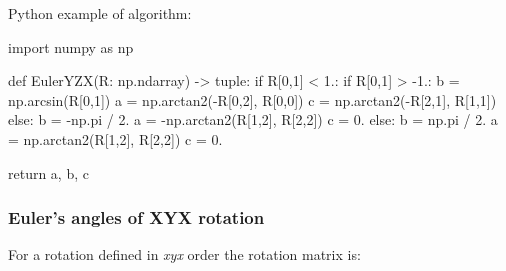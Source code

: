     Python example of algorithm:

\begin{python}
import numpy as np

def EulerYZX(R: np.ndarray) -> tuple:
    if R[0,1] < 1.:
        if R[0,1] > -1.:
            b = np.arcsin(R[0,1])
            a = np.arctan2(-R[0,2], R[0,0])
            c = np.arctan2(-R[2,1], R[1,1])
        else:
            b = -np.pi / 2.
            a = -np.arctan2(R[1,2], R[2,2])
            c = 0.
    else:
        b = np.pi / 2.
        a = np.arctan2(R[1,2], R[2,2])
        c = 0.

    return a, b, c
\end{python}

\subsubsection{Euler's angles of \textbf{XYX} rotation}

    For a rotation defined in \textit{xyx} order the rotation matrix is:

